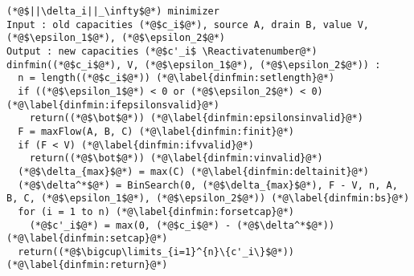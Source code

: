 \Suppressnumber
\begin{lstlisting}[label=dinf, style=numbers]
(*@$||\delta_i||_\infty$@*) minimizer
Input : old capacities (*@$c_i$@*), source A, drain B, value V, (*@$\epsilon_1$@*), (*@$\epsilon_2$@*)
Output : new capacities (*@$c'_i$ \Reactivatenumber@*)
dinfmin((*@$c_i$@*), V, (*@$\epsilon_1$@*), (*@$\epsilon_2$@*)) :
  n = length((*@$c_i$@*)) (*@\label{dinfmin:setlength}@*)
  if ((*@$\epsilon_1$@*) < 0 or (*@$\epsilon_2$@*) < 0) (*@\label{dinfmin:ifepsilonsvalid}@*)
    return((*@$\bot$@*)) (*@\label{dinfmin:epsilonsinvalid}@*)
  F = maxFlow(A, B, C) (*@\label{dinfmin:finit}@*)
  if (F < V) (*@\label{dinfmin:ifvvalid}@*)
    return((*@$\bot$@*)) (*@\label{dinfmin:vinvalid}@*)
  (*@$\delta_{max}$@*) = max(C) (*@\label{dinfmin:deltainit}@*)
  (*@$\delta^*$@*) = BinSearch(0, (*@$\delta_{max}$@*), F - V, n, A, B, C, (*@$\epsilon_1$@*), (*@$\epsilon_2$@*)) (*@\label{dinfmin:bs}@*)
  for (i = 1 to n) (*@\label{dinfmin:forsetcap}@*)
    (*@$c'_i$@*) = max(0, (*@$c_i$@*) - (*@$\delta^*$@*)) (*@\label{dinfmin:setcap}@*)
  return((*@$\bigcup\limits_{i=1}^{n}\{c'_i\}$@*)) (*@\label{dinfmin:return}@*)
\end{lstlisting}
